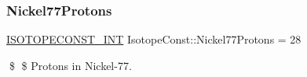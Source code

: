 \subsubsection{\texorpdfstring{Nickel77\+Protons}{Nickel77Protons}}
{\footnotesize\ttfamily \mbox{\hyperlink{group___isotope_const-_macros_ga5f18360b3e99483a35c32d789e62621c}{I\+S\+O\+T\+O\+P\+E\+C\+O\+N\+S\+T\+\_\+\+I\+NT}} Isotope\+Const\+::\+Nickel77\+Protons = 28}

\$ \$ Protons in Nickel-\/77. 